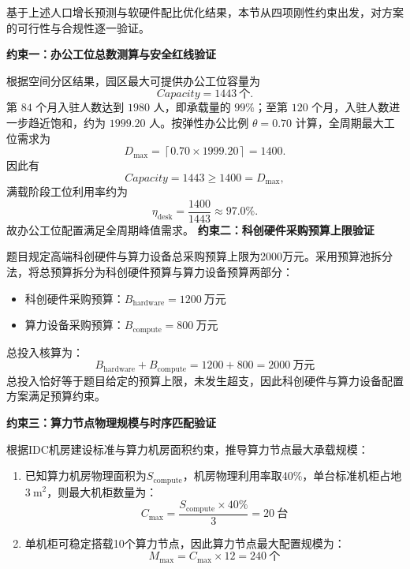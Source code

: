 \documentclass[12pt,a4paper]{article}
\begin{document}
基于上述人口增长预测与软硬件配比优化结果，本节从四项刚性约束出发，对方案的可行性与合规性逐一验证。

\textbf{约束一：办公工位总数测算与安全红线验证}

根据空间分区结果，园区最大可提供办公工位容量为 
\begin{equation} 
Capacity=1443 \ \text{个}. 
\end{equation} 
第 $84$ 个月入驻人数达到 $1980$ 人，即承载量的 $99\%$；至第 $120$ 个月，入驻人数进一步趋近饱和，约为 $1999.20$ 人。按弹性办公比例 $\theta=0.70$ 计算，全周期最大工位需求为 
\begin{equation} 
D_{\max} = \left\lceil 0.70\times1999.20 \right\rceil = 1400. 
\end{equation} 因此有 
\begin{equation} Capacity=1443\geq1400=D_{\max}, 
\end{equation} 满载阶段工位利用率约为 
\begin{equation} 
\eta_{\mathrm{desk}}=\frac{1400}{1443}\approx97.0\%. 
\end{equation} 故办公工位配置满足全周期峰值需求。
\vspace{1em}
\textbf{约束二：科创硬件采购预算上限验证}

题目规定高端科创硬件与算力设备总采购预算上限为2000万元。采用预算池拆分法，将总预算拆分为科创硬件预算与算力设备预算两部分：
\begin{itemize}
    \item 科创硬件采购预算：$B_{\text{hardware}} = 1200 \ \text{万元}$
    \item 算力设备采购预算：$B_{\text{compute}} = 800 \ \text{万元}$
\end{itemize}

总投入核算为：
\[
B_{\text{hardware}} + B_{\text{compute}} = 1200 + 800 = 2000 \ \text{万元}
\]
总投入恰好等于题目给定的预算上限，未发生超支，因此科创硬件与算力设备配置方案满足预算约束。

\vspace{1em}
\textbf{约束三：算力节点物理规模与时序匹配验证}

根据IDC机房建设标准与算力机房面积约束，推导算力节点最大承载规模：
\begin{enumerate}
    \item 已知算力机房物理面积为$S_{\text{compute}}$，机房物理利用率取40\%，单台标准机柜占地$3\ \text{m}^2$，则最大机柜数量为：
    \[
    C_{\text{max}} = \frac{S_{\text{compute}} \times 40\%}{3} = 20 \ \text{台}
    \]
    \item 单机柜可稳定搭载10个算力节点，因此算力节点最大配置规模为：
    \[
    M_{\text{max}} = C_{\text{max}} \times 12 = 240 \ \text{个}
    \]
\end{enumerate}
\end{document}
